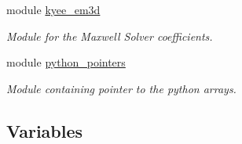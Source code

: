 \begin{DoxyCompactItemize}
module \hyperlink{namespacekyee__em3d}{kyee\+\_\+em3d}
\begin{DoxyCompactList}\small\item\em Module for the Maxwell Solver coefficients. \end{DoxyCompactList}\item 
module \hyperlink{namespacepython__pointers}{python\+\_\+pointers}
\begin{DoxyCompactList}\small\item\em Module containing pointer to the python arrays. \end{DoxyCompactList}\end{DoxyCompactItemize}
\subsection*{Variables}
